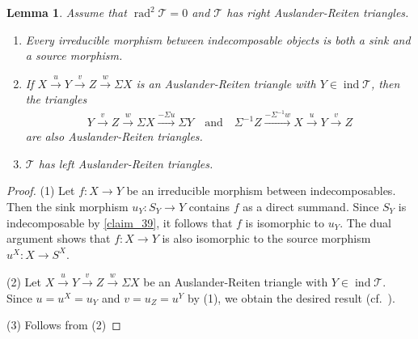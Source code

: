 \documentclass[12pt]{amsart}
\numberwithin{equation}{subsection}
\theoremstyle{plain}
\newtheorem{lemma}[theorem]{Lemma}
\theoremstyle{definition}
\newcommand{\rad}{\operatorname{rad}}
\newcommand{\ind}{\operatorname{ind}}
\newcommand{\T}{\mathcal{T}}
\begin{document}
\begin{lemma}\label{claim_26}
Assume that $\rad^2\T=0$ and $\T$ has right Auslander-Reiten triangles.
\begin{enumerate}
\item Every irreducible morphism between indecomposable objects is both a sink and a source morphism. 
\item  If $X \xrightarrow{u} Y \xrightarrow{v} Z \xrightarrow{w} \Sigma X$ is an Auslander-Reiten triangle with $Y\in\ind\T$, then the triangles 
\begin{align}
   Y \xrightarrow{v} Z \xrightarrow{w} \Sigma X \xrightarrow{-\Sigma u} \Sigma Y
   \quad\text{and}\quad
   \Sigma^{-1} Z \xrightarrow{-\Sigma^{-1}w} X \xrightarrow{u} Y \xrightarrow{v} Z
\end{align}
are also Auslander-Reiten triangles.
\item  $\T$ has left Auslander-Reiten triangles.
\end{enumerate}
\end{lemma}
\begin{proof}
(1) Let $f:X\to Y$ be an irreducible morphism between indecomposables.
Then the sink morphism $u_Y: S_Y \to Y$ contains $f$ as a direct summand.
Since $S_Y$ is indecomposable by \cref{claim_39}, it follows that $f$ is isomorphic to $u_Y$.
The dual argument shows that $f:X\to Y$ is also isomorphic to the source morphism $u^X: X \to S^X$. 



(2) Let $X \xrightarrow{u} Y \xrightarrow{v} Z \xrightarrow{w} \Sigma X$ be an Auslander-Reiten triangle with $Y\in\ind\T$.
Since $u=u^X=u_Y$ and $v=u_Z=u^Y$ by (1), we obtain the desired result (cf.~\cite[Theorem 2.9]{Iyama-Nakaoka-Palu_2024}).




(3) Follows from (2) 
\end{proof}
\end{document}
